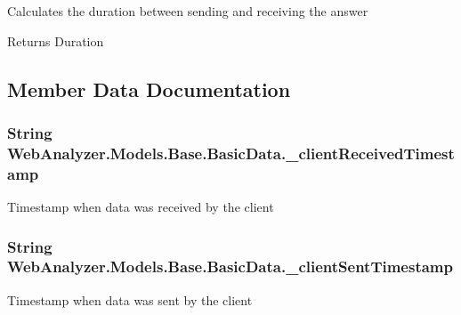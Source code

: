 Calculates the duration between sending and receiving the answer 

\begin{DoxyReturn}{Returns}
Duration
\end{DoxyReturn}


\subsection{Member Data Documentation}
\hypertarget{class_web_analyzer_1_1_models_1_1_base_1_1_basic_data_a9bbe1d03f8e822eb5c6ff47cea03c46e}{}
\subsubsection[{\+\_\+client\+Received\+Timestamp}]{\setlength{\rightskip}{0pt plus 5cm}String Web\+Analyzer.\+Models.\+Base.\+Basic\+Data.\+\_\+client\+Received\+Timestamp\hspace{0.3cm}{\ttfamily [protected]}}\label{class_web_analyzer_1_1_models_1_1_base_1_1_basic_data_a9bbe1d03f8e822eb5c6ff47cea03c46e}


Timestamp when data was received by the client 

\hypertarget{class_web_analyzer_1_1_models_1_1_base_1_1_basic_data_af7624b281535382cf49d15dd9faddf47}{}
\subsubsection[{\+\_\+client\+Sent\+Timestamp}]{\setlength{\rightskip}{0pt plus 5cm}String Web\+Analyzer.\+Models.\+Base.\+Basic\+Data.\+\_\+client\+Sent\+Timestamp\hspace{0.3cm}{\ttfamily [protected]}}\label{class_web_analyzer_1_1_models_1_1_base_1_1_basic_data_af7624b281535382cf49d15dd9faddf47}


Timestamp when data was sent by the client 

